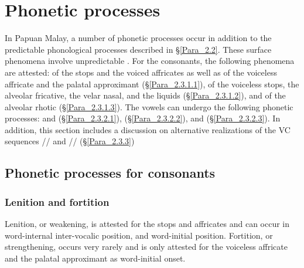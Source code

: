 \section{Phonetic processes\label{Para_2.3}}

In Papuan Malay, a number of phonetic processes occur in addition to the predictable phonological processes described in §\ref{Para_2.2}. These surface phenomena involve unpredict\-able . For the consonants, the following phenomena are attested:  of the stops and the voiced affricates as well as  of the voiceless affricate and the palatal approximant (§\ref{Para_2.3.1.1}),  of the voiceless stops, the alveolar fricative, the velar nasal, and the liquids (§\ref{Para_2.3.1.2}), and  of the alveolar rhotic (§\ref{Para_2.3.1.3}). The vowels can undergo the following phonetic processes:  and  (§\ref{Para_2.3.2.1}),  (§\ref{Para_2.3.2.2}), and  (§\ref{Para_2.3.2.3}). In addition, this section includes a discussion on alternative realizations of the VC sequences // and // (§\ref{Para_2.3.3})


\subsection{Phonetic processes for consonants\label{Para_2.3.1}}
\subsubsection[Lenition and {fortition}]{Lenition and {fortition}\label{Para_2.3.1.1}}
 
Lenition, or weakening, is attested for the stops and affricates and can occur in word-internal inter-vocalic position, and word-initial position. Fortition, or strengthening, occurs very rarely and is only attested for the voiceless affricate and the palatal approximant as word-initial onset.


